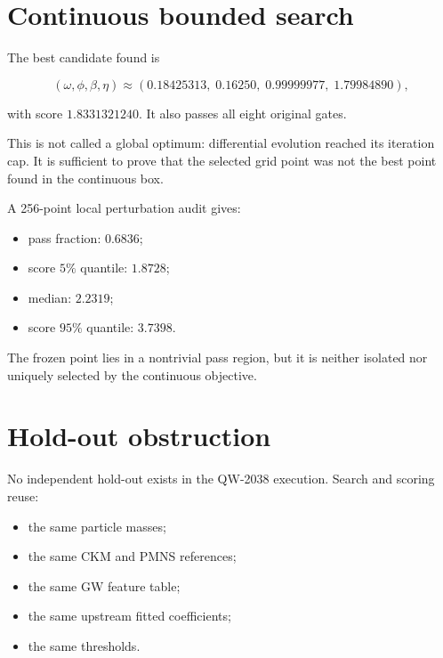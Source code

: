 \documentclass[11pt,a4paper,openany]{report}
\begin{document}
\section{Continuous bounded search}

The best candidate found is

\[
(\omega,\phi,\beta,\eta)
\approx
(0.18425313,\;0.16250,\;0.99999977,\;1.79984890),
\]

with score \(1.8331321240\). It also passes all eight original gates.

This is not called a global optimum: differential evolution reached its iteration cap. It is sufficient to prove that the selected grid point was not the best point found in the continuous box.

A 256-point local perturbation audit gives:

\begin{itemize}
\item 
pass fraction: \(0.6836\);

\item 
score \(5\%\) quantile: \(1.8728\);

\item 
median: \(2.2319\);

\item 
score \(95\%\) quantile: \(3.7398\).

\end{itemize}

The frozen point lies in a nontrivial pass region, but it is neither isolated nor uniquely selected by the continuous objective.

\section{Hold-out obstruction}

No independent hold-out exists in the QW-2038 execution. Search and scoring reuse:

\begin{itemize}
\item 
the same particle masses;

\item 
the same CKM and PMNS references;

\item 
the same GW feature table;

\item 
the same upstream fitted coefficients;

\item 
the same thresholds.

\end{itemize}
\end{document}
